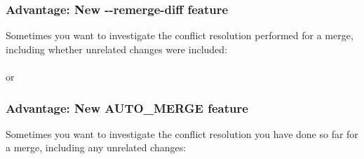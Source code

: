 \documentclass[compress,t]{beamer}
\begin{document}

\begin{frame}
  \frametitle{Advantage: New {-}{-}remerge-diff feature}

  Sometimes you want to investigate the conflict resolution performed
  for a merge, including whether unrelated changes were included:\\
  \vspace*{\baselineskip}
  \qquad{}\\
  or\\
  \qquad{}

\end{frame}


\begin{frame}[fragile]
  \frametitle{Advantage: New AUTO\_MERGE feature}

  Sometimes you want to investigate the conflict resolution you have
  done so far for a merge, including any unrelated changes:\\
  \vspace*{\baselineskip}
  \qquad{}

  \begin{comment}
  ALTERNATE:

  There are a variety of questions users might ask while resolving
  conflicts:
  \vspace*{-\baselineskip}
  \begin{enumerate}
    \item What changes have been made since the previous (first) parent?
    \item What changes are staged?
    \item What is still unstaged? (or what is still conflicted?)
    \item What changes did I make to resolve conflicts so far?
  \end{enumerate}

  \vspace*{\baselineskip}
  The first three of these have simple answers:
  \begin{enumerate}
    \item \texttt{git diff HEAD}
    \item \texttt{git diff {-}{-}cached}
    \item \texttt{git diff}
  \end{enumerate}

  Due to the new merge strategy, the fourth now has an answer too:
  \begin{enumerate}[4]
    \item \texttt{git diff AUTO\_MERGE}
  \end{enumerate}
  \end{comment}

\end{frame}
\end{document}
